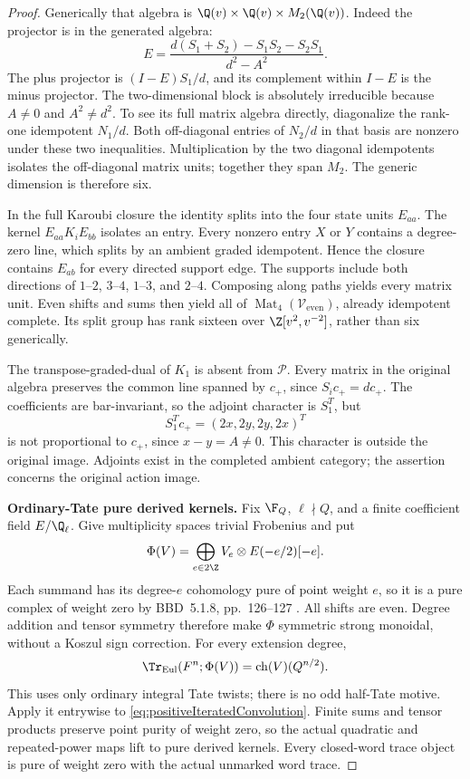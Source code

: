 \begin{proof}
Generically that algebra is
\(\Q(v)\times\Q(v)\times M_2(\Q(v))\).
Indeed the projector is in the generated algebra:
\[
 E=\frac{d(S_1+S_2)-S_1S_2-S_2S_1}{d^2-A^2}.
\]
The plus projector is \((I-E)S_1/d\), and its
complement within \(I-E\) is the minus projector.
The two-dimensional block is absolutely irreducible
because \(A\ne0\) and \(A^2\ne d^2\).
To see its full matrix algebra directly, diagonalize
the rank-one idempotent \(N_1/d\).
Both off-diagonal entries of \(N_2/d\) in that
basis are nonzero under these two inequalities.
Multiplication by the two diagonal idempotents
isolates the off-diagonal matrix units; together
they span \(M_2\).
The generic dimension is therefore six.

In the full Karoubi closure the identity splits into
the four state units \(E_{aa}\).
The kernel \(E_{aa}K_iE_{bb}\) isolates an entry.
Every nonzero entry \(X\) or \(Y\) contains a
degree-zero line, which splits by an ambient graded
idempotent. Hence the closure contains \(E_{ab}\)
for every directed support edge.
The supports include both directions of
\(1\)--\(2\), \(3\)--\(4\),
\(1\)--\(3\), and \(2\)--\(4\).
Composing along paths yields every matrix unit.
Even shifts and sums then yield all of
\(\operatorname{Mat}_4(\mathcal V_{\mathrm{even}})\),
already idempotent complete.
Its split group has rank sixteen over
\(\Z[v^2,v^{-2}]\), rather than six generically.

The transpose-graded-dual of \(K_1\) is absent
from \(\mathcal P\). Every matrix in the original
algebra preserves the common line spanned by
\(c_+\), since \(S_ic_+=dc_+\).
The coefficients are bar-invariant, so the adjoint
character is \(S_1^T\), but
\[
                       S_1^Tc_+=(2x,2y,2y,2x)^T
\]
is not proportional to \(c_+\), since \(x-y=A\ne0\).
This character is outside the original image.
Adjoints exist in the completed ambient category;
the assertion concerns the original action image.

\par\smallskip\noindent\textbf{Ordinary-Tate pure derived kernels.}\quad
Fix \(\F_Q\), \(\ell\nmid Q\), and a finite
coefficient field \(E/\Q_\ell\).
Give multiplicity spaces trivial Frobenius and put
\begin{equation}\label{eq:positiveIteratedTateFunctor}
                \Phi(V)=\bigoplus_{e\in2\Z}
                    V_e\otimes E(-e/2)[-e].
\end{equation}
Each summand has its degree-\(e\) cohomology pure
of point weight \(e\), so it is a pure complex of
weight zero by BBD~5.1.8, pp.~126--127
\cite{BBD}.
All shifts are even. Degree addition and tensor
symmetry therefore make \(\Phi\) symmetric strong
monoidal, without a Koszul sign correction.
For every extension degree,
\[
       \Tr_{\mathrm{Eul}}(F^n;\Phi(V))
                       =\operatorname{ch}(V)(Q^{n/2}).
\]
This uses only ordinary integral Tate twists;
there is no odd half-Tate motive.
Apply it entrywise to
\eqref{eq:positiveIteratedConvolution}.
Finite sums and tensor products preserve point
purity of weight zero, so the actual quadratic
and repeated-power maps lift to pure derived
kernels. Every closed-word trace object is pure
of weight zero with the actual unmarked word trace.


\end{proof}
